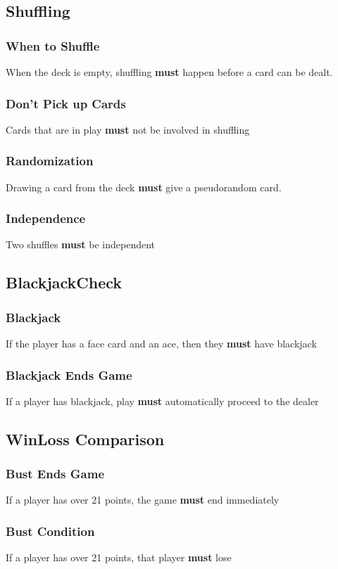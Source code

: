 \documentclass{article}
\begin{document}
\subsection{Shuffling}
\subsubsection{When to Shuffle}When the deck is empty, shuffling \textbf{must} happen before a card can be dealt.
\subsubsection{Don't Pick up Cards}Cards that are in play \textbf{must} not be involved in shuffling
\subsubsection{Randomization}Drawing a card from the deck \textbf{must} give a pseudorandom card.
\subsubsection{Independence}Two shuffles \textbf{must} be independent
\subsection{ BlackjackCheck}
\subsubsection{Blackjack} If the player has a face card and an ace, then they \textbf{must} have blackjack
\subsubsection{Blackjack Ends Game}If a player has blackjack, play \textbf{must} automatically proceed to the dealer
\subsection{WinLoss Comparison}
\subsubsection{Bust Ends Game}If a player has over 21 points, the game \textbf{must} end immediately
\subsubsection{Bust Condition}If a player has over 21 points, that player \textbf{must} lose
\end{document}
